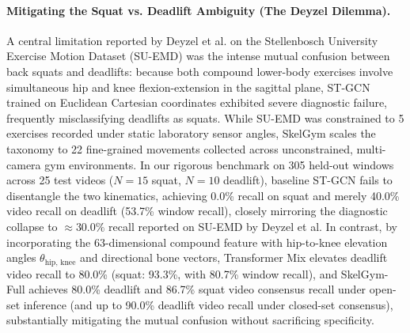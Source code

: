 \documentclass[runningheads]{llncs}
\begin{document}
\paragraph{Mitigating the Squat vs. Deadlift Ambiguity (The Deyzel Dilemma).}
A central limitation reported by Deyzel et al. \cite{deyzel2023} on the Stellenbosch University Exercise Motion Dataset (SU-EMD) was the intense mutual confusion between back squats and deadlifts: because both compound lower-body exercises involve simultaneous hip and knee flexion-extension in the sagittal plane, ST-GCN trained on Euclidean Cartesian coordinates exhibited severe diagnostic failure, frequently misclassifying deadlifts as squats. While SU-EMD was constrained to 5 exercises recorded under static laboratory sensor angles, SkelGym scales the taxonomy to 22 fine-grained movements collected across unconstrained, multi-camera gym environments. In our rigorous benchmark on 305 held-out windows across 25 test videos ($N=15$ squat, $N=10$ deadlift), baseline ST-GCN fails to disentangle the two kinematics, achieving 0.0\% recall on squat and merely 40.0\% video recall on deadlift (53.7\% window recall), closely mirroring the diagnostic collapse to $\approx 30.0\%$ recall reported on SU-EMD by Deyzel et al. In contrast, by incorporating the 63-dimensional compound feature with hip-to-knee elevation angles $\theta_{\text{hip, knee}}$ and directional bone vectors, Transformer Mix elevates deadlift video recall to 80.0\% (squat: 93.3\%, with 80.7\% window recall), and SkelGym-Full achieves 80.0\% deadlift and 86.7\% squat video consensus recall under open-set inference (and up to 90.0\% deadlift video recall under closed-set consensus), substantially mitigating the mutual confusion without sacrificing specificity.
\end{document}
